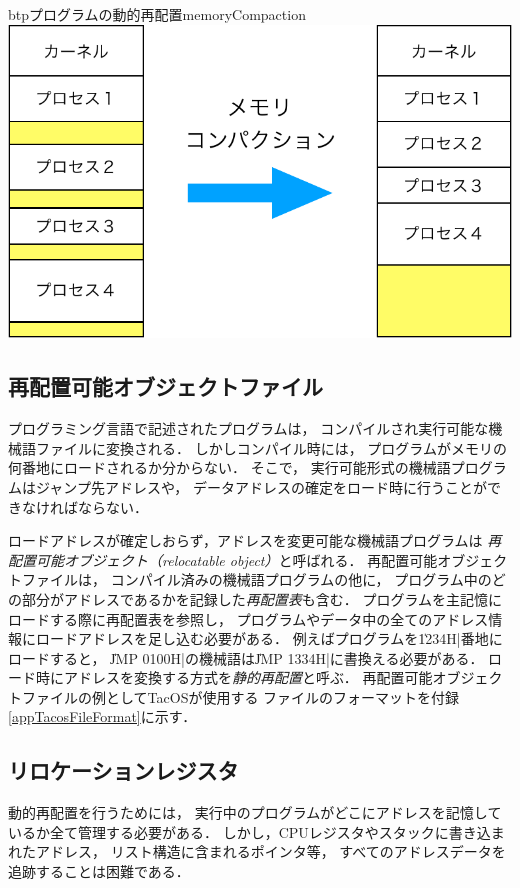\begin{myfig}{btp}{プログラムの動的再配置}{memoryCompaction}
  \includegraphics[scale=0.60]{Fig/memoryCompaction-crop.pdf}
\end{myfig}

\subsection{再配置可能オブジェクトファイル}
プログラミング言語で記述されたプログラムは，
コンパイルされ実行可能な機械語ファイルに変換される．
しかしコンパイル時には，
プログラムがメモリの何番地にロードされるか分からない．
そこで，
実行可能形式の機械語プログラムはジャンプ先アドレスや，
データアドレスの確定をロード時に行うことができなければならない．

ロードアドレスが確定しおらず，アドレスを変更可能な機械語プログラムは
\emph{再配置可能オブジェクト（relocatable object）}と呼ばれる．
再配置可能オブジェクトファイルは，
コンパイル済みの機械語プログラムの他に，
プログラム中のどの部分がアドレスであるかを記録した\emph{再配置表}も含む．
プログラムを主記憶にロードする際に再配置表を参照し，
プログラムやデータ中の全てのアドレス情報にロードアドレスを足し込む必要がある．
例えばプログラムを\|1234H|番地にロードすると，
\|JMP 0100H|の機械語は\|JMP 1334H|に書換える必要がある．
ロード時にアドレスを変換する方式を\emph{静的再配置}と呼ぶ．
再配置可能オブジェクトファイルの例としてTacOSが使用する
ファイルのフォーマットを付録\ref{appTacosFileFormat}に示す．

\subsection{リロケーションレジスタ}
動的再配置を行うためには，
実行中のプログラムがどこにアドレスを記憶しているか全て管理する必要がある．
しかし，CPUレジスタやスタックに書き込まれたアドレス，
リスト構造に含まれるポインタ等，
すべてのアドレスデータを追跡することは困難である．

